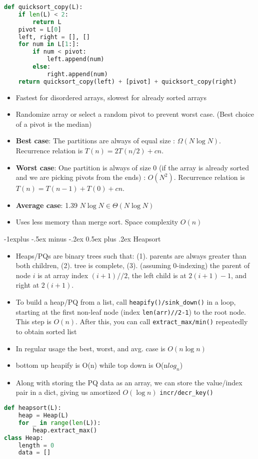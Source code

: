 \documentclass[letterpaper, 8pt]{extarticle}
\makeatletter
\renewcommand{\subsection}{\@startsection{subsection}{2}{0mm}%
                                {-1explus -.5ex minus -.2ex}%
                                {0.5ex plus .2ex}%
                                {\normalfont\small\bfseries}}
\newcommand\ttt\texttt
\makeatother
\begin{document}
\begin{multicols*}{5}
\begin{lstlisting}[language=Python, breaklines=true, postbreak=\mbox{\textcolor{red}{$\hookrightarrow$}\space}]
def quicksort_copy(L):
    if len(L) < 2:
        return L
    pivot = L[0]
    left, right = [], []
    for num in L[1:]:
        if num < pivot:
            left.append(num)
        else:
            right.append(num)
    return quicksort_copy(left) + [pivot] + quicksort_copy(right)
 \end{lstlisting}
  \begin{itemize}
    \item Fastest for disordered arrays, slowest for already sorted arrays
    \item Randomize array or select a random pivot to prevent worst case. (Best choice of a pivot is the median)
    \item \textbf{Best case}: The partitions are always of equal size : $\Omega(N \log N)$. Recurrence relation is $T(n) = 2T(n/2) + cn$.
    \item \textbf{Worst case}: One partition is always of size 0 (if the array is already sorted and we are picking pivots from the ends) : $O(N^2)$. Recurrence relation is $T(n) = T(n - 1) + T(0) + cn$.
    \item \textbf{Average case}: 1.39 $N\log{N} \in \Theta(N \log N)$
    \item Uses less memory than merge sort. Space complexity $O(n)$
  \end{itemize}

\subsection{Heapsort}
\begin{itemize}
    \item Heaps/PQs are binary trees such that: (1). parents are always greater than both children, (2). tree is complete, (3). (assuming 0-indexing) the parent of node $i$ is at array index $(i+1)//2$, the left child is at $2(i+1)-1$, and right at $2(i+1)$.
    \item To build a heap/PQ from a list, call \ttt{heapify()/sink\_down()} in a loop, starting at the first non-leaf node (index \ttt{len(arr)//2-1}) to the root node. This step is $O(n)$. After this, you can call \ttt{extract\_max/min()} repeatedly to obtain sorted list
    \item In regular usage the best, worst, and avg. case is $O(n\log n)$
    \item bottom up heapify is O(n) while top down is O(n$log_n$)
    \item Along with storing the PQ data as an array, we can store the value/index pair in a dict, giving us amortized $O(\log n)$ \ttt{incr/decr\_key()}
\end{itemize}
  \begin{lstlisting}[language=Python, breaklines=true, postbreak=\mbox{\textcolor{red}{$\hookrightarrow$}\space}]
def heapsort(L):
    heap = Heap(L)
    for _ in range(len(L)):
        heap.extract_max()
class Heap:
    length = 0
    data = []


\end{lstlisting}
\end{multicols*}
\end{document}
